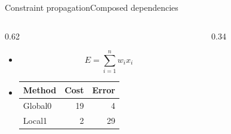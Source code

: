 \documentclass[10pt,aspectratio=43]{beamer}
\begin{document}
\begin{frame}[t,shrink=5]{Constraint propagation}{Composed dependencies}
\begin{columns}[onlytextwidth,T]
\begin{column}{0.62\textwidth}
\begin{enumerate}
\begin{itemize}
\item \[E=\sum_{i=1}^{n}w_i x_i\]
\item \begin{tabular}{lrr}Method&Cost&Error\\\hline
Global0&19&4\\
Local1&2&29\\
\end{tabular}
\end{itemize}
\end{enumerate}
\end{column}
\begin{column}{0.34\textwidth}
\end{column}
\end{columns}
\end{frame}
\end{document}
